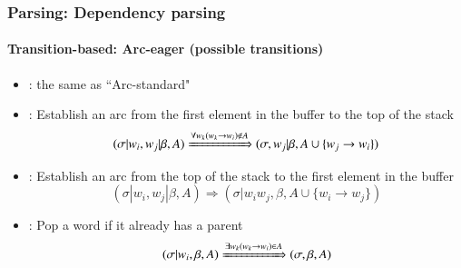 \documentclass[xcolor=table]{beamer}
\begin{document}
\begin{frame}
\frametitle{Parsing: Dependency parsing}
\framesubtitle{Transition-based: Arc-eager (possible transitions)}

\begin{itemize}
	\item {}: the same as ``Arc-standard"
	
	\item {}: Establish an arc from the first element in the buffer to the top of the stack
	\[ (\sigma|w_i, w_j|\beta, A) \xRightarrow{\forall w_k (w_k \rightarrow w_i) \notin A}  (\sigma, w_j|\beta, A \cup \{w_j \rightarrow w_i \}) \] 
	
	\item {}: Establish an arc from the top of the stack to the first element in the buffer
	\[ (\sigma|w_i, w_j|\beta, A) \Rightarrow  (\sigma|w_i w_j, \beta, A \cup \{w_i \rightarrow w_j \}) \] 
	
	\item {}: Pop a word if it already has a parent
	\[ (\sigma|w_i, \beta, A) \xRightarrow{\exists w_k (w_k \rightarrow w_i) \in A} (\sigma, \beta, A) \] 
\end{itemize}

\end{frame}
\end{document}
